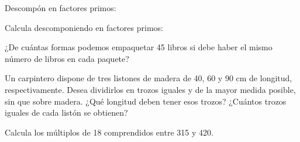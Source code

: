 \documentclass[addpoints,spanish, 12pt,a4paper]{exam}
\renewcommand*\half{.5}
\begin{document}
\begin{questions}
    \question[1\half] Descompón en factores primos:
    \begin{multicols}{2}
    \end{multicols}

    \question[1\half] Calcula descomponiendo en factores primos:
    \begin{multicols}{2}
    
    \end{multicols}

    \question[1\half] ¿De cuántas formas podemos empaquetar 45 libros si debe haber el mismo número de libros en cada paquete?\vspace{20pt}\vspace{20pt}\vspace{50pt}

    \question[2] Un carpintero dispone de tres listones de madera de 40, 60 y 90 cm de longitud, respectivamente. Desea dividirlos en trozos iguales y de la mayor medida posible, sin que sobre madera. ¿Qué longitud deben tener esos trozos? ¿Cuántos trozos iguales de cada listón se obtienen?\vspace{20pt}\vspace{20pt}\vspace{50pt}

    \question[1\half] Calcula los múltiplos de 18 comprendidos entre 315 y 420.

\end{questions}
\end{document}
